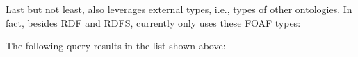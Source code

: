 

\noindent
Last but not least, \solasote{} also leverages external types, i.e.,
types of other ontologies. In fact, besides RDF and RDFS, \solasote{}
currently only uses these FOAF types:


\noindent
The following query results in the list shown above:


